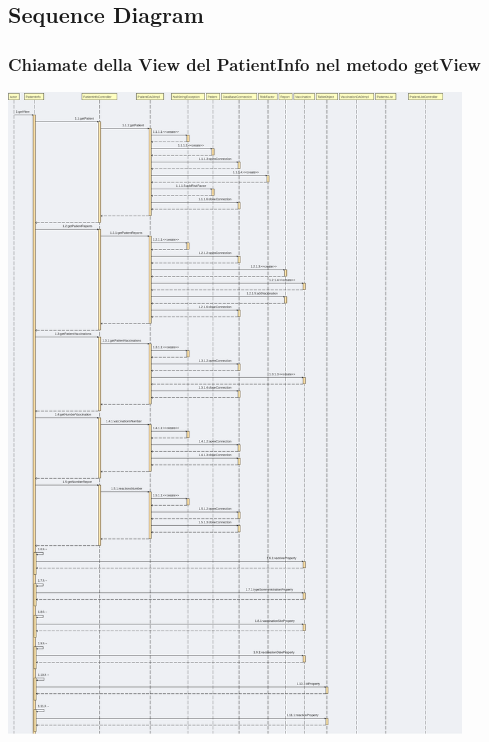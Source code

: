 \documentclass[11pt]{article}
\begin{document}
\newpage
    \subsection{Sequence Diagram}
    \subsubsection*{Chiamate della View del PatientInfo nel metodo getView}
    \begin{center}
        \includegraphics[width=0.90\textwidth]{pictures/prova_001.png}
    \end{center}
\end{document}

